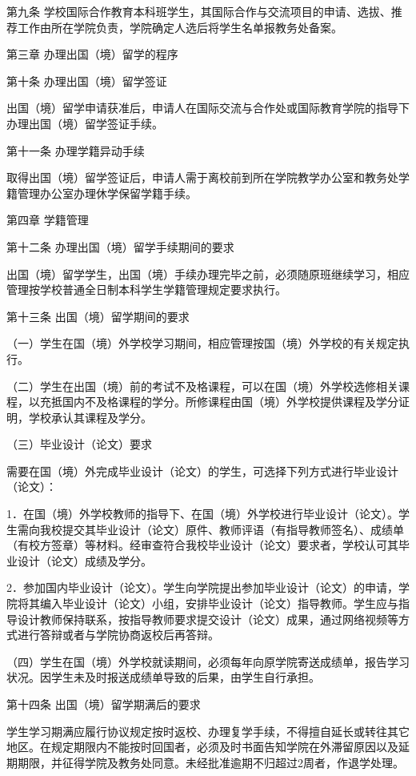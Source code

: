 \documentclass[UTF8,12pt,a4paper]{report}
\begin{document}
第九条 学校国际合作教育本科班学生，其国际合作与交流项目的申请、选拔、推荐工作由所在学院负责，学院确定人选后将学生名单报教务处备案。

第三章 办理出国（境）留学的程序

第十条 办理出国（境）留学签证

出国（境）留学申请获准后，申请人在国际交流与合作处或国际教育学院的指导下办理出国（境）留学签证手续。

第十一条 办理学籍异动手续

取得出国（境）留学签证后，申请人需于离校前到所在学院教学办公室和教务处学籍管理办公室办理休学保留学籍手续。

第四章 学籍管理

第十二条 办理出国（境）留学手续期间的要求

出国（境）留学学生，出国（境）手续办理完毕之前，必须随原班继续学习，相应管理按学校普通全日制本科学生学籍管理规定要求执行。

第十三条 出国（境）留学期间的要求

（一）学生在国（境）外学校学习期间，相应管理按国（境）外学校的有关规定执行。

（二）学生在出国（境）前的考试不及格课程，可以在国（境）外学校选修相关课程，以充抵国内不及格课程的学分。所修课程由国（境）外学校提供课程及学分证明，学校承认其课程及学分。

（三）毕业设计（论文）要求

需要在国（境）外完成毕业设计（论文）的学生，可选择下列方式进行毕业设计（论文）：

1．在国（境）外学校教师的指导下、在国（境）外学校进行毕业设计（论文）。学生需向我校提交其毕业设计（论文）原件、教师评语（有指导教师签名）、成绩单（有校方签章）等材料。经审查符合我校毕业设计（论文）要求者，学校认可其毕业设计（论文）成绩及学分。

2．参加国内毕业设计（论文）。学生向学院提出参加毕业设计（论文）的申请，学院将其编入毕业设计（论文）小组，安排毕业设计（论文）指导教师。学生应与指导设计教师保持联系，按指导教师要求提交设计（论文）成果，通过网络视频等方式进行答辩或者与学院协商返校后再答辩。

（四）学生在国（境）外学校就读期间，必须每年向原学院寄送成绩单，报告学习状况。因学生未及时报送成绩单导致的后果，由学生自行承担。

第十四条 出国（境）留学期满后的要求

学生学习期满应履行协议规定按时返校、办理复学手续，不得擅自延长或转往其它地区。在规定期限内不能按时回国者，必须及时书面告知学院在外滞留原因以及延期期限，并征得学院及教务处同意。未经批准逾期不归超过2周者，作退学处理。
\end{document}
